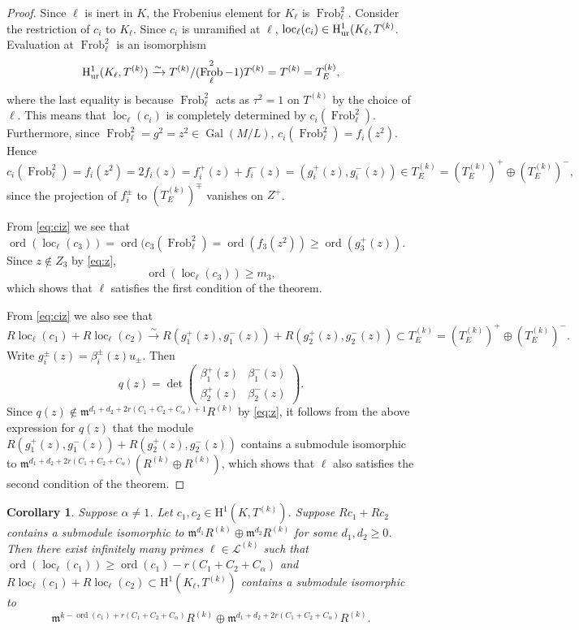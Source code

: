 \documentclass[10pt]{amsart}
\numberwithin{equation}{section}
\newtheorem{cor}[theorem]{Corollary}
\theoremstyle{definition}
\theoremstyle{remark}
\newcommand{\rH}{\mathrm{H}}
\newcommand{\fm}{\mathfrak{m}}
\DeclareMathOperator{\Frob}{Frob}
\DeclareMathOperator{\loc}{loc}
\DeclareMathOperator{\ord}{ord}
\DeclareMathOperator{\Gal}{Gal}
\newcommand{\CL}{\mathscr{L}}
\begin{document}
\begin{proof}
Since $\ell$ is inert in $K$, the Frobenius element for $K_\ell$ is $\Frob_\ell^2$. Consider the restriction of
$c_i$ to $K_\ell$. Since $c_i$ is unramified at $\ell$, $\loc_\ell(c_i)\in \rH^1_{\rm ur}(K_\ell,T^{(k)}$.
Evaluation at $\Frob_\ell^2$ is an isomorphism
$$
\rH^1_{\rm ur}(K_\ell, T^{(k)}) \xrightarrow\sim T^{(k)}/(\Frob_\ell^2-1)T^{(k)} = T^{(k)} = T_E^{(k)},
$$
where the last equality is because $\Frob_\ell^2$ acts as $\tau^2 = 1$ on $T^{(k)}$ by the choice of $\ell$.
This means that $\loc_\ell(c_i)$ is completely determined by $c_i(\Frob_\ell^2)$.
Furthermore, since $\Frob_\ell^2 = g^2  = z^2 \in \Gal(M/L)$, $c_i(\Frob_\ell^2) = f_i(z^2)$. Hence 
\begin{equation}\label{eq:ciz}
c_i(\Frob_\ell^2) = f_i(z^2) = 2f_i(z) = f_i^+(z) + f_i^-(z) = (g_i^+(z),g_i^-(z)) \in T_E^{(k)} = (T_E^{(k)})^+\oplus (T_E^{(k)})^-,
\end{equation}
since the projection of $f_i^\pm$ to $(T_E^{(k)})^\mp$ vanishes on $Z^+$.  

From \eqref{eq:ciz} we see that $\ord(\loc_\ell(c_3)) = \ord(c_3(\Frob_\ell^2) = \ord(f_3(z^2)) \geqslant \ord(g_3^+(z))$.
Since $z\not\in Z_3$ by \eqref{eq:z},
$$
\ord(\loc_\ell(c_3)) \geqslant m_3,
$$
which shows that $\ell$ satisfies the first condition of the theorem.

From \eqref{eq:ciz} we also see that
$$
R\loc_\ell(c_1) + R\loc_\ell(c_2) \xrightarrow\sim R (g_1^+(z),g_1^-(z)) + R(g_2^+(z),g_2^-(z)) \subset T_E^{(k)} = (T_E^{(k)})^+\oplus (T_E^{(k)})^-.
$$
Write $g_i^\pm(z) = \beta_i^\pm(z)u_\pm$. Then 
$$
q(z) = \det\left(\begin{matrix}
\beta_1^+(z) & \beta_1^-(z) \\
\beta_2^+(z) & \beta_2^-(z) 
\end{matrix}\right).
$$
Since $q(z) \not\in \fm^{d_1+d_2+2r(C_1+C_2+C_\alpha)+1}R^{(k)}$ by \eqref{eq:z}, it follows from the above 
expression for $q(z)$ that the module
$R (g_1^+(z),g_1^-(z)) + R(g_2^+(z),g_2^-(z))$ contains a submodule isomorphic to 
$\fm^{d_1+d_2+2r(C_1+C_2+C_\alpha)}(R^{(k)}\oplus R^{(k)})$, which shows that $\ell$ also satisfies the
second condition of the theorem.
\end{proof}

\begin{cor}\label{cor:prime2} Suppose $\alpha\neq 1$.
Let $c_1, c_2 \in \rH^1(K,T^{(k)})$. Suppose $Rc_1 + Rc_2$ contains a submodule isomorphic to 
$\fm^{d_1} R^{(k)}\oplus \fm^{d_2} R^{(k)}$ for some $d_1,d_2 \geqslant 0$.
Then there exist infinitely many primes $\ell\in \CL^{(k)}$ such that 
$\ord(\loc_\ell(c_1)) \geqslant \ord(c_1) - r(C_1+C_2+C_\alpha)$ and 
$R\loc_\ell(c_1) + R \loc_\ell(c_2) \subset \rH^1(K_\ell,T^{(k)})$ contains a
submodule isomorphic to 
$$
\fm^{k-\ord(c_1)+r(C_1+C_2+C_\alpha)}R^{(k)} \oplus \fm^{d_1+d_2+2r(C_1+C_2+C_\alpha)}R^{(k)}.
$$
\end{cor}
\end{document}
